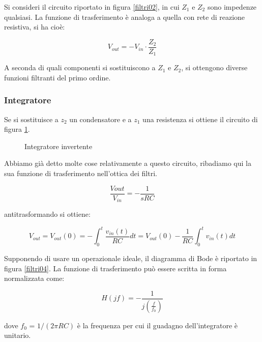 \documentclass[../main.tex]{subfiles}
\begin{document}
Si consideri il circuito riportato in figura \ref{filtri02}, in cui $Z_1$ e $Z_2$ sono impedenze qualsiasi. La funzione di trasferimento è analoga a quella con rete di reazione resistiva, si ha cioè:

\begin{equation}
	V_{out} = -V_{in} \cdot \frac{Z_2}{Z_1}
\end{equation}

A seconda di quali componenti si sostituiscono a $Z_1$ e $Z_2$, si ottengono diverse funzioni filtranti del primo ordine.


\subsubsection{Integratore}

Se si sostituisce a $z_2$ un condensatore e a $z_1$ una resistenza si ottiene il circuito di figura \ref{filtri03}.

\begin{figure}
\begin{center}



\label{filtri03}
\caption{Integratore invertente}	
\end{center}	
\end{figure}

Abbiamo già detto molte cose relativamente a questo circuito, ribadiamo qui la sua funzione di trasferimento nell’ottica dei filtri.

\begin{equation}
	\frac{V{out}}{V_{in}} = - \frac{1}{sRC}
\end{equation}

antitrasformando si ottiene:

\begin{equation}
	V_{out} = V_{out}(0) = - \int_0^t \frac{v_{in}(t)}{RC} dt = V_{out}(0) - \frac{1}{RC} \int_0^t v_{in}(t) dt
\end{equation}

Supponendo di usare un operazionale ideale, il diagramma di Bode è riportato in figura \ref{filtri04}. La funzione di trasferimento può essere scritta in forma normalizzata come:

\begin{equation}
	H(jf) = - \frac{1}{j(\frac{f}{f_0})}
\end{equation}

dove $f_0$ = $1 /(2 \pi RC)$ è la frequenza per cui il guadagno dell’integratore è unitario.
\end{document}
